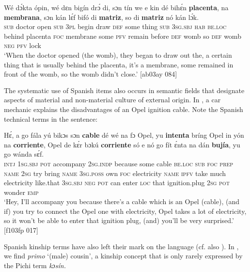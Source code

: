 \ea%
    \label{ex:key:1761}
    \gll Wé  dɔ́kta  ópin,  wé  dɛn  bigín  drɔ́    di,  sɔn    tín    we e    kin  dé    bihɛ́n \textbf{placenta},    na \textbf{membrana},  sɔn    kán  lɛ́f bifó    di  \textbf{matriz},  so  di  \textbf{matriz}  nó  kán  lɔ́k.\\
\textsc{sub}  doctor  open  \textsc{sub}  \textsc{3pl}  begin  draw  \textsc{def}  some  thing  \textsc{sub}
\textsc{3sg.sbj}  \textsc{hab}  \textsc{be.loc}  behind  placenta    \textsc{foc}  membrane  some  \textsc{pfv}  remain
before  \textsc{def}  womb  so  \textsc{def}  womb  \textsc{neg}  \textsc{pfv}  lock\\

\glt ‘When the doctor opened (the womb), they began to draw out the, a certain thing that 
is usually behind the placenta, it’s a membrane, some remained in front of the womb, 
so the womb didn’t close.’ [ab03ay 084]
\z

The systematic use of Spanish items also occurs in semantic fields that designate aspects of material and non-material culture of external origin. In , a car mechanic explains the disadvantages of an Opel ignition cable. Note the Spanish technical terms in the sentence: 


\ea%
    \label{ex:key:1762}
    \gll Hɛ́,  a    go  fála      yú    bikɔs  sɔn   \textbf{cable}  dé
wé  na  fɔ  Opel,  yu  \textbf{intenta}  bríng  Opel    in    yón   na
\textbf{corriente},  Opel    de  kɛ́r    bɔkú \textbf{corriente} só    e
nó  go  fít  ɛ́nta    na  dán \textbf{bujía},    yu  go  wánda  sɛ́f.\\
\textsc{intj}  \textsc{1sg.sbj}  \textsc{pot}  accompany  \textsc{2sg.indp}  because  some  cable  \textsc{be.loc}
\textsc{sub}  \textsc{foc}  \textsc{prep}  \textsc{name}  \textsc{2sg}  try    bring  \textsc{name}  \textsc{3sg.poss}  own  \textsc{foc}
electricity  \textsc{name}  \textsc{ipfv}  take    much  electricity  like.that  \textsc{3sg.sbj}
\textsc{neg}  \textsc{pot}  can  enter  \textsc{loc}  that  ignition.plug  \textsc{2sg}  \textsc{pot}  wonder  \textsc{emp}\\

\glt ‘Hey, I’ll accompany you because there’s a cable which is an Opel (cable), (and if) you try to connect the Opel one with electricity, Opel takes a lot of electricity, so it won’t be able to enter that ignition plug, (and) you’ll be very surprised.’ [f103fp 017]
\z

Spanish kinship terms have also left their mark on the language (cf. also ). In , we find \textit{primo} ‘(male) cousin’, a kinship concept that is only rarely expressed by the Pichi term \textit{kɔsín.}


